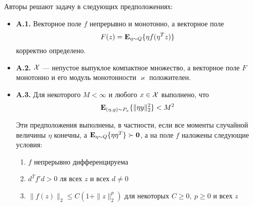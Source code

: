 Авторы решают задачу в следующих предположениях:

\begin{itemize}
    \item \textbf{A.1.} Векторное поле $f$ непрерывно и монотонно, а векторное поле
    \begin{equation}
        \label{assumpt_1}
        F(z) = {\mathbf{E}}_{\eta \sim Q} \{\eta f(\eta^T z) \}
    \end{equation}
    корректно определено.
    
    \item \textbf{A.2.} ${\cal X}$ --- непустое выпуклое компактное множество, а векторное поле $F$ монотонно и его модуль монотонности $\varkappa$ положителен.
    
    \item \textbf{A.3.} Для некоторого $M < \infty$ и любого $x \in {\cal X}$ выполнено, что
    \begin{equation}
        \label{assumpt_3}
        {\mathbf{E}}_{\left(\eta, y\right) \sim P_x} \{\|\eta y\|_2^2 \} < M^2
    \end{equation}
    
    Эти предположения выполнены, в частности, если все моменты случайной величины $\eta$ конечны, а ${\mathbf{E}}_{\eta \sim Q} \{\eta \eta^T\} \succ \mathbf{0}$, а на поле $f$ наложены следующие условия:
    \begin{enumerate}
        \item $f$ непрерывно дифференцируема
        \item $d^T f' d > 0$ ля всех $z$ и всех $d \neq 0$ 
        \item $\|f(z)\|_2 \leqslant C(1 + \|z\|_2^p)$ для некоторых $C \geqslant 0,\ p \geqslant 0$ и всех $z$
    \end{enumerate}
\end{itemize}